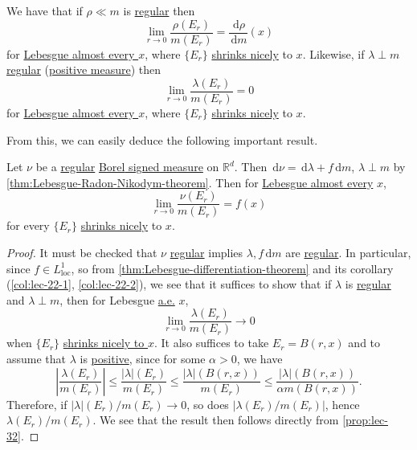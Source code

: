 \begin{prev}
	We have that if \(\rho \ll m\) is \hyperref[def:regular]{regular} then
	\[
		\lim_{r \to 0} \frac{\rho(E_r)}{m(E_r)} = \frac{\,\mathrm{d}\rho}{\,\mathrm{d}m}(x)
	\]
	for \hyperref[def:mu-almost-everywhere]{Lebesgue almost every \(x\)}, where \(\{E_r\}\) \hyperref[def:shrink-nicely]{shrinks nicely} to \(x\).
	Likewise, if \(\lambda \perp m\) \hyperref[def:regular]{regular} (\hyperref[def:signed-measure]{positive measure}) then
	\[
		\lim_{r \to 0} \frac{\lambda(E_r)}{m(E_r)} = 0
	\]
	for \hyperref[def:mu-almost-everywhere]{Lebesgue almost every \(x\)}, where \(\{E_r\}\) \hyperref[def:shrink-nicely]{shrinks nicely} to \(x\).
\end{prev}

From this, we can easily deduce the following important result.
\begin{theorem}\label{thm:Lebesgue-differentiation-theorem-for-regular-measure}
	Let \(\nu\) be a \hyperref[def:regular]{regular}  \hyperref[def:signed-measure]{\hyperref[def:Borel-measure]{Borel} signed measure} on \(\mathbb{R} ^d\).
	Then \(\,\mathrm{d}\nu = \,\mathrm{d}\lambda + f \,\mathrm{d}m\), \(\lambda \perp m\) by \autoref{thm:Lebesgue-Radon-Nikodym-theorem}.
	Then for \hyperref[def:mu-almost-everywhere]{Lebesgue almost every} \(x\),
	\[
		\lim_{r \to 0} \frac{\nu(E_r)}{m(E_r)} = f(x)
	\]
	for every \(\{E_r\}\) \hyperref[def:shrink-nicely]{shrinks nicely} to \(x\).
\end{theorem}
\begin{proof}
	It must be checked that \(\nu\) \hyperref[def:regular]{regular} implies \(\lambda, f \,\mathrm{d}m\) are \hyperref[def:regular]{regular}.
	In particular, since \(f\in L^1_{\mathrm{loc} } \), so from \autoref{thm:Lebesgue-differentiation-theorem} and its corollary (\autoref{col:lec-22-1}, \autoref{col:lec-22-2}),
	we see that it suffices to show that if \(\lambda \) is \hyperref[def:regular]{regular} and \(\lambda \perp m\),
	then for Lebesgue \hyperref[def:mu-almost-everywhere]{a.e.} \(x\),
	\[
		\lim\limits_{r \to 0} \frac{\lambda (E_{r} )}{m(E_{r} )}\to 0
	\]
	when \(\{E_{r} \}\) \hyperref[def:shrink-nicely]{shrinks nicely to \(x\)}. It also suffices to take \(E_{r} = B(r, x)\) and to assume that \(\lambda \) is
	\hyperref[def:signed-measure]{positive}, since for some \(\alpha >0\), we have
	\[
		\left\vert \frac{\lambda (E_{r} )}{m(E_{r} )} \right\vert
		\leq \frac{\left\vert \lambda \right\vert(E_{r} ) }{m(E_{r} )}
		\leq \frac{\left\vert \lambda \right\vert(B(r, x)) }{m(E_{r} )}
		\leq \frac{\left\vert \lambda \right\vert(B(r, x)) }{\alpha m(B(r, x))}.
	\]
	Therefore, if \(\left\vert \lambda \right\vert(E_{r} ) / m(E_{r} ) \to 0\), so does \(\left\vert \lambda (E_{r} ) / m(E_{r} ) \right\vert \),
	hence \(\lambda (E_{r} ) / m(E_{r} )\). We see that the result then follows directly from \autoref{prop:lec-32}.
\end{proof}

